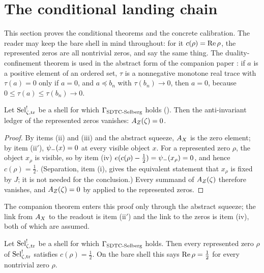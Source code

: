 \section{The conditional landing chain}
\label{sec:landing_chain}

This section proves the conditional theorems and the concrete
calibration.  The reader may keep the bare shell in mind throughout: for
it \(c(\rho)=\operatorname{Re}\rho\), the represented zeros are all nontrivial
zeros, and  say the same
thing.  The duality-confinement theorem is used in the abstract
form of the companion paper \citep[Remark~7.2]{TsiokosSDTC2026}: if
\(a\) is a positive element of an ordered set, \(\tau\) is a
nonnegative monotone real trace with \(\tau(a)=0\) only if \(a=0\), and
\(a\preceq b_n\) with \(\tau(b_n)\to0\), then \(a=0\), because
\(0\leq\tau(a)\leq\tau(b_n)\to0\).

\begin{theorem}
\label{thm:rh:dc-master-applied}
Let \(\mathrm{Sel}^{!}_{\zeta,\mathrm{tr}}\) be a shell for which \(\Gamma_{\mathrm{SDTC\text{-}Selberg}}\) holds
().  Then the
anti-invariant ledger of the represented zeros vanishes: \(A_{Z}(\zeta)=0\).
\end{theorem}

\begin{proof}
By items (ii) and (iii) and the abstract squeeze, \(A_{X}\) is the zero
element; by item (ii\('\)), \(\psi_{-}(x)=0\) at every visible object \(x\).
For a represented zero \(\rho\), the object \(x_\rho\) is visible, so
by item (iv) \(e(c(\rho)-\frac12)=\psi_{-}(x_\rho)=0\), and
hence \(c(\rho)=\frac12\).  (Separation, item (i), gives the equivalent
statement that \(x_\rho\) is fixed by \(J\); it is not needed for the
conclusion.)  Every summand of \(A_{Z}(\zeta)\) therefore vanishes, and
\(A_{Z}(\zeta)=0\) by  applied to the represented zeros.
\end{proof}

The companion theorem enters this proof only through the abstract
squeeze; the link from \(A_{X}\) to the readout is item (ii\('\)) and the
link to the zeros is item (iv), both of which are assumed.

\begin{theorem}
\label{thm:rh:conditional}
Let \(\mathrm{Sel}^{!}_{\zeta,\mathrm{tr}}\) be a shell for which \(\Gamma_{\mathrm{SDTC\text{-}Selberg}}\) holds.  Then every represented zero \(\rho\) of \(\mathrm{Sel}^{!}_{\zeta,\mathrm{tr}}\)
satisfies \(c(\rho)=\frac12\).  On the bare shell this says
\(\operatorname{Re}\rho=\frac12\) for every nontrivial zero \(\rho\).
\end{theorem}


